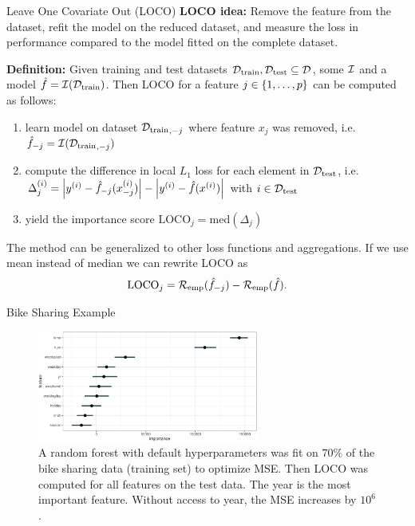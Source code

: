 \documentclass[11pt,compress,t,notes=noshow, aspectratio=169, xcolor=table]{beamer}
\begin{document}
\begin{frame}{Leave One Covariate Out (LOCO)  }
%
\textbf{LOCO idea:} Remove the feature from the dataset, refit the model on the reduced dataset, and measure the loss in performance compared to the model fitted on the complete dataset. %

\pause\lz

\textbf{Definition:} Given training and test datasets $\Dtrain, \Dtest \subseteq \D$, some $\inducer$ and a model $\fh = \inducer(\Dtrain)$. Then LOCO for a feature $j \in \pset$ can be computed as follows:
  \begin{enumerate}
    \item learn model on dataset ${\Dtrain}_{,-j}$ where feature $x_j$ was removed, i.e. $\fh_{-j} = \inducer({\Dtrain}_{,-j})$\pause
    \item compute the difference in local $L_1$ loss for each element in $\Dtest$, i.e. $\Delta_j^{(i)} = \left  |y^{(i)} - \fh_{-j}(x_{-j}^{(i)}) \right | - \left |y^{(i)} - \fh(x^{(i)}) \right | $ with $i \in \Dtest$\pause
    \item yield the importance score $\text{LOCO}_j = \text{med} \left ( \Delta_j  \right )$
  \end{enumerate}
\lz\pause
The method can be generalized to other loss functions and aggregations. If we use mean instead of median we can rewrite LOCO as
%
$$ \text{LOCO}_j = \riske(\fh_{-j}) - \riske(\fh).$$
\end{frame}

\begin{frame}{Bike Sharing Example}
%
\begin{figure}
  \centering
  \includegraphics[width=0.65\textwidth]{figure_man/bike_sharing_loco.pdf}
\caption{A random forest with default hyperparameters was fit on $70\%$ of the bike sharing data (training set) to optimize MSE. Then LOCO was computed for all features on the test data. The year is the most important feature. Without access to year, the MSE increases by $10^6$.}
\end{figure}
%
%
\end{frame}
\end{document}
